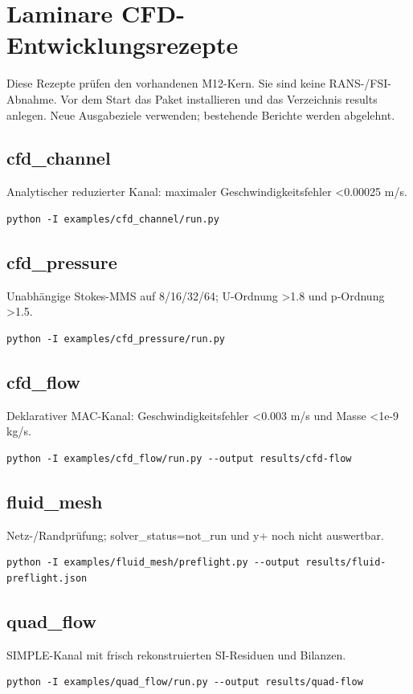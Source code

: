 \chapter{Laminare CFD-Entwicklungsrezepte}
\label{application:cfd}
Diese Rezepte prüfen den vorhandenen M12-Kern. Sie sind keine RANS-/FSI-Abnahme. Vor dem Start das Paket installieren und das Verzeichnis results anlegen. Neue Ausgabeziele verwenden; bestehende Berichte werden abgelehnt.
\section{cfd\_channel}
\label{recipe:cfd-channel}
Analytischer reduzierter Kanal: maximaler Geschwindigkeitsfehler <0.00025 m/s.
\begin{lstlisting}
python -I examples/cfd_channel/run.py
\end{lstlisting}

\section{cfd\_pressure}
\label{recipe:cfd-pressure}
Unabhängige Stokes-MMS auf 8/16/32/64; U-Ordnung >1.8 und p-Ordnung >1.5.
\begin{lstlisting}
python -I examples/cfd_pressure/run.py
\end{lstlisting}

\section{cfd\_flow}
\label{recipe:cfd-flow}
Deklarativer MAC-Kanal: Geschwindigkeitsfehler <0.003 m/s und Masse <1e-9 kg/s.
\begin{lstlisting}
python -I examples/cfd_flow/run.py --output results/cfd-flow
\end{lstlisting}

\section{fluid\_mesh}
\label{recipe:fluid-mesh}
Netz-/Randprüfung; solver\_status=not\_run und y+ noch nicht auswertbar.
\begin{lstlisting}
python -I examples/fluid_mesh/preflight.py --output results/fluid-preflight.json
\end{lstlisting}

\section{quad\_flow}
\label{recipe:quad-flow}
SIMPLE-Kanal mit frisch rekonstruierten SI-Residuen und Bilanzen.
\begin{lstlisting}
python -I examples/quad_flow/run.py --output results/quad-flow
\end{lstlisting}

